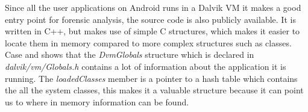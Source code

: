 Since all the user applications on Android runs in a Dalvik VM it makes a good entry
point for forensic analysis, the source code is also publicly available. It is
written in C++, but makes use of simple C structures, which makes it easier to
locate them in memory compared to more complex structures such as classes. Case
and \cite{holger} shows that the \textit{DvmGlobals} structure which is
declared in \textit{dalvik/vm/Globals.h} contains a lot of information about
the application it is running. The \textit{loadedClasses} member is a pointer
to a hash table which contains the all the system classes, this makes it a
valuable structure because it can point us to where in memory information can
be found. 


